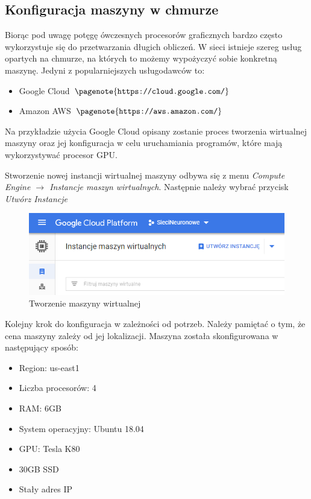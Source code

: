 	\subsection{Konfiguracja maszyny w chmurze}
	
	Biorąc pod uwagę potęgę ówczesnych procesorów graficznych bardzo często wykorzystuje się do przetwarzania długich obliczeń. W sieci istnieje szereg usług opartych na chmurze, na których to możemy wypożyczyć sobie konkretną maszynę. Jedyni z popularniejszych usługodawców to:
	
	\begin{itemize}
		\item Google Cloud $\pagenote{\texttt{https://cloud.google.com/}}$
		\item Amazon AWS $\pagenote{\texttt{https://aws.amazon.com/}}$
	\end{itemize}

Na przykładzie użycia Google Cloud opisany zostanie proces tworzenia wirtualnej maszyny oraz jej konfiguracja w celu uruchamiania programów, które mają wykorzystywać procesor GPU. 

Stworzenie nowej instancji wirtualnej maszyny odbywa się z menu \textit{Compute Engine $\rightarrow$ Instancje maszyn wirtualnych}. Następnie należy wybrać przycisk \textit{Utwórz Instancje}

\begin{figure}[H]
	\centering
	\includegraphics[width=0.7\linewidth]{google_cloud}
	\caption{Tworzenie maszyny wirtualnej}
	\label{fig:googlecloud}
\end{figure}
Kolejny krok do konfiguracja w zależności od potrzeb. Należy pamiętać o tym, że cena maszyny zależy od jej lokalizacji. Maszyna została skonfigurowana w następujący sposób:

\begin{itemize}
	\item Region: us-east1
	\item Liczba procesorów: 4
	\item RAM: 6GB
	\item System operacyjny: Ubuntu 18.04
	\item GPU: Tesla K80
	\item 30GB SSD
	\item Stały adres IP
\end{itemize}	

